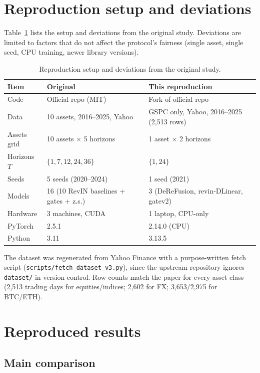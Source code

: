 \documentclass[preprint,12pt]{elsarticle}
\begin{document}
\section{Reproduction setup and deviations}
\label{sec:setup}

Table~\ref{tab:setup} lists the setup and deviations from the original
study. Deviations are limited to factors that do not affect the protocol's
fairness (single asset, single seed, CPU training, newer library versions).

\begin{table}[H]
\centering
\caption{Reproduction setup and deviations from the original study.}
\label{tab:setup}
\begin{tabular}{lll}
\toprule
Item & Original & This reproduction \\
\midrule
Code & Official repo (MIT) & Fork of official repo \\
Data & 10 assets, 2016--2025, Yahoo & GSPC only, Yahoo, 2016--2025 (2{,}513 rows) \\
Assets grid & 10 assets $\times$ 5 horizons & 1 asset $\times$ 2 horizons \\
Horizons $T$ & $\{1,7,12,24,36\}$ & $\{1,24\}$ \\
Seeds & 5 seeds (2020--2024) & 1 seed (2021) \\
Models & 16 (10 RevIN baselines + gates + z.s.) & 3 (DeReFusion, revin-DLinear, gatev2) \\
Hardware & 3 machines, CUDA & 1 laptop, CPU-only \\
PyTorch & 2.5.1 & 2.14.0 (CPU) \\
Python & 3.11 & 3.13.5 \\
\bottomrule
\end{tabular}
\end{table}

The dataset was regenerated from Yahoo Finance with a purpose-written fetch
script (\texttt{scripts/fetch\_dataset\_v3.py}), since the upstream
repository ignores \texttt{dataset/} in version control. Row counts match
the paper for every asset class (2{,}513 trading days for equities/indices;
2{,}602 for FX; 3{,}653/2{,}975 for BTC/ETH).

\section{Reproduced results}
\label{sec:results}

\subsection{Main comparison}
\end{document}
